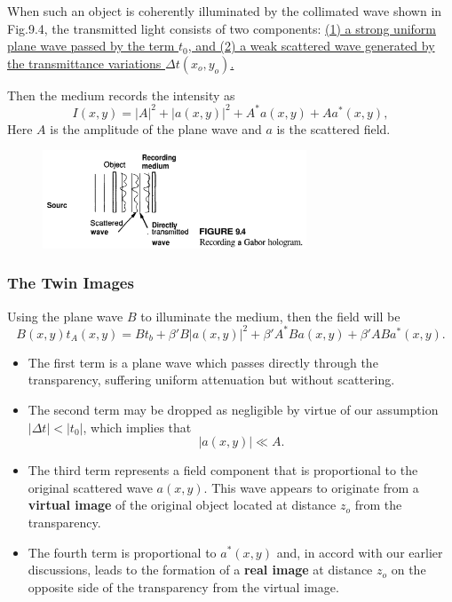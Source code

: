 \documentclass[en,hazy,device=normal,blue,14pt]{elegantnote}
\begin{document}
When such an object is coherently illuminated by the collimated wave shown in Fig.9.4, the transmitted light consists of two components: \uline{(1) a strong uniform plane wave passed by the term $t_0$, and (2) a weak scattered wave generated by the transmittance variations $\Delta t\left( {{x_o},{y_o}} \right)$.}

Then the medium records the intensity as
\begin{equation}
  I\left( {x,y} \right) = {\left| {A} \right|^2} + {\left| {a\left( {x,y} \right)} \right|^2} + A^*a\left(x,y\right)+Aa^*\left(x,y\right),
\end{equation}
Here $A$ is the amplitude of the plane wave and $a$ is the scattered field.

\begin{figure}[htbp]
  \centering
  \includegraphics[width=0.7\textwidth]{4.png}
\end{figure}

\subsubsection{The Twin Images}
Using the plane wave $B$ to illuminate the medium, then the field will be
\begin{equation}
  B\left( {x,y} \right){t_A}\left( {x,y} \right) = B{t_b} +  \beta'B{\left| {a\left( {x,y} \right)} \right|^2} + \beta'A^*Ba\left(x,y\right)+\beta'ABa^*\left(x,y\right).
\end{equation}
\begin{itemize}
  \item The first term is a plane wave which passes directly through the transparency, suffering uniform attenuation but without scattering.
  \item The second term may be dropped as negligible by virtue of our assumption $\left|\Delta t\right|<\left|t_0\right|$, which implies that
  \begin{equation}
    \left| {a\left( {x,y} \right)} \right| \ll A.
  \end{equation}
  \item The third term represents a field component that is proportional to the original scattered wave $a(x, y)$. This wave appears to originate from a \textbf{virtual image} of the original object located at distance $z_o$ from the transparency.
  \item The fourth term is proportional to $a^*(x, y)$ and, in accord with our earlier discussions, leads to the formation of a \textbf{real image} at distance $z_o$ on the opposite side of the transparency from the virtual image.
\end{itemize}
\end{document}
